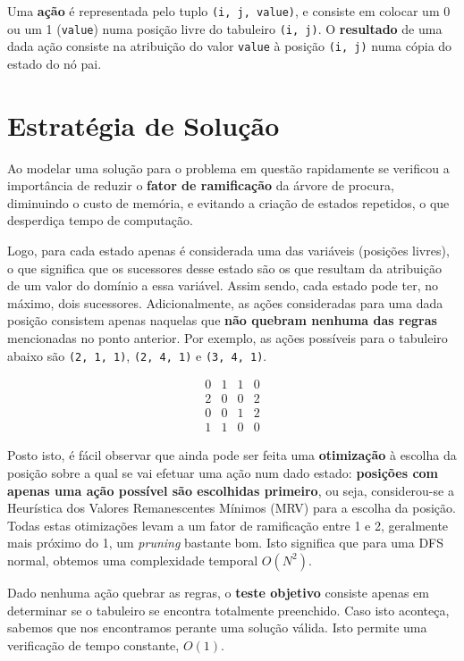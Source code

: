 \documentclass[12pt,a4paper]{article}
\begin{document}
Uma \textbf{ação} é representada pelo tuplo \texttt{(i, j, value)}, e consiste em colocar um 0 ou um 1 (\texttt{value})
numa posição livre do tabuleiro \texttt{(i, j)}. O \textbf{resultado} de uma dada ação consiste na
atribuição do valor \texttt{value} à posição \texttt{(i, j)} numa cópia do estado do nó pai.

\section{Estratégia de Solução}

Ao modelar uma solução para o problema em questão rapidamente se verificou a importância de reduzir
o \textbf{fator de ramificação} da árvore de procura, diminuindo o custo de memória,
e evitando a criação de estados repetidos, o que desperdiça tempo de computação.

Logo, para cada estado apenas é considerada uma das variáveis (posições livres), o que significa
que os sucessores desse estado são os que resultam da atribuição de um valor do domínio a essa variável.
Assim sendo, cada estado pode ter, no máximo, dois sucessores.
Adicionalmente, as ações consideradas para uma dada posição consistem apenas naquelas que
\textbf{não quebram nenhuma das regras} mencionadas no ponto anterior.
Por exemplo, as ações possíveis para o tabuleiro abaixo são
\texttt{(2, 1, 1)}, \texttt{(2, 4, 1)} e \texttt{(3, 4, 1)}.

\[
  \begin{array}{cccc}
    0 & 1 & 1 & 0 \\
    2 & 0 & 0 & 2 \\
    0 & 0 & 1 & 2 \\
    1 & 1 & 0 & 0
  \end{array}
\]

Posto isto, é fácil observar que ainda pode ser feita uma \textbf{otimização} à escolha da
posição sobre a qual se vai efetuar uma ação num dado estado:
\textbf{posições com apenas uma ação possível são escolhidas primeiro},
ou seja, considerou-se a Heurística dos Valores Remanescentes Mínimos (MRV) para
a escolha da posição.
Todas estas otimizações levam a um fator de ramificação entre 1 e 2,
geralmente mais próximo do 1, um \textit{pruning} bastante bom.
Isto significa que para uma DFS normal, obtemos uma complexidade temporal \(O(N^2)\).

Dado nenhuma ação quebrar as regras, o \textbf{teste objetivo} consiste apenas em determinar
se o tabuleiro se encontra totalmente preenchido. Caso isto aconteça, sabemos que
nos encontramos perante uma solução válida. Isto permite uma verificação de tempo constante, \(O(1)\).
\end{document}
